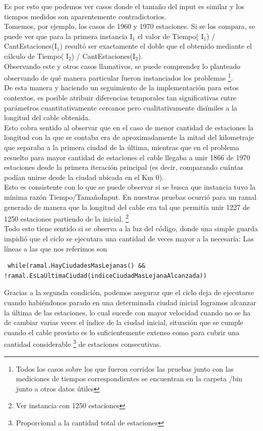 Es por esto que podemos ver casos donde el tamaño del input es similar y los tiempos medidos son aparentemente contradictorios.\\
Tomemos, por ejemplo, los casos de 1960 y 1970 estaciones. Si se los compara, se puede ver que para la primera instancia I$_{1}$ el valor de Tiempo( I$_{1}$) / CantEstaciones(I$_{1}$) resultó ser exactamente el doble que el obtenido mediante el cálculo de Tiempo( I$_{2}$) / CantEstaciones(I$_{2}$).\\
Observando este y otros casos llamativos, se puede comprender lo planteado observando de qué manera particular fueron instanciados los problemas \footnote{Todos los casos sobre los que fueron corridos las pruebas junto con las mediciones de tiempos correspondientes se encuentran en la carpeta /bin junto a otros datos útiles}.\\
De esta manera y haciendo un seguimiento de la implementación para estos contextos, es posible atribuir diferencias temporales tan significativas entre parámetros cuantitativamente cercanos pero cualitativamente disímiles a la longitud del cable obtenida. \\
Esto cobra sentido al observar que en el caso de menor cantidad de estaciones la longitud con la que se contaba era de aproximadamente la mitad del kilometraje que separaba a la primera ciudad de la última, mientras que en el problema resuelto para mayor cantidad de estaciones el cable llegaba a unir 1866 de 1970 estaciones desde la primera iteración principal (es decir, comparando cuántas podían unirse desde la ciudad ubicada en el Km 0).\\

Esto es consistente con lo que se puede observar si se busca que instancia tuvo la mínima razón Tiempo/TamañoInput. En nuestras pruebas ocurrió para un ramal generado de manera que la longitud del cable era tal que permitía unir 1227 de 1250 estaciones partiendo de la inicial. \footnote{Ver instancia con 1250 estaciones}\\

Todo esto tiene sentido si se observa a la luz del código, donde una simple guarda impidió que el ciclo se ejecutara una cantidad de veces mayor a la necesaria: Las líneas a las que nos referimos son 
\begin{verbatim}
 while(ramal.HayCiudadesMasLejanas() && !ramal.EsLaUltimaCiudad(indiceCiudadMasLejanaAlcanzada)) 
\end{verbatim}

Gracias a la segunda condición, podemos asegurar que el ciclo deja de ejecutarse cuando habiéndonos parado en una determinada ciudad inicial logramos alcanzar la última de las estaciones, lo cual sucede con mayor velocidad cuando no se ha de cambiar varias veces el índice de la ciudad inicial, situación que se cumple cuando el cable provisto es lo suficientemente extenso como para cubrir una cantidad considerable \footnote{Proporcional a la cantidad total de estaciones} de estaciones consecutivas.




\newpage
